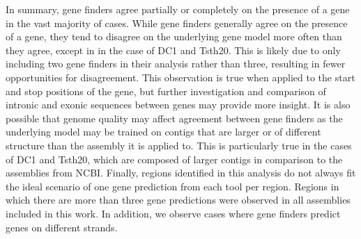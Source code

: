 In summary, gene finders agree partially or completely on the presence
of a gene in the vast majority of cases. While gene finders generally
agree on the presence of a gene, they tend to disagree on the
underlying gene model more often than they agree, except in in the
case of DC1 and Tsth20. This is likely due to only including two gene
finders in their analysis rather than three, resulting in fewer
opportunities for disagreement. This observation is true when applied
to the start and stop positions of the gene, but further investigation
and comparison of intronic and exonic sequences between genes may
provide more insight. It is also possible that genome quality may
affect agreement between gene finders as the underlying model may be
trained on contigs that are larger or of different structure than the
assembly it is applied to. This is particularly true in the cases of
DC1 and Tsth20, which are composed of larger contigs in comparison to
the assemblies from NCBI. Finally, regions identified in this analysis
do not always fit the ideal scenario of one gene prediction from each
tool per region. Regions in which there are more than three gene
predictions were observed in all assemblies included in this work. In
addition, we observe cases where gene finders predict genes on
different strands.
